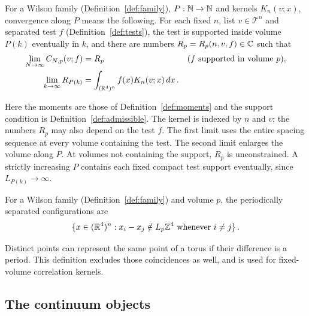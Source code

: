 \begin{definition}\label{def:ordered}
For a Wilson family (Definition~\ref{def:family}), $P:\mathbb N\to\mathbb N$ and kernels $K_n(v;x)$, convergence along $P$ means the following.
For each fixed $n$, list $v\in\mathcal T^n$ and separated test $f$ (Definition~\ref{def:tests}), the test is supported inside volume $P(k)$ eventually in $k$, and there are numbers $R_p=R_p(n,v,f)\in\mathbb C$ such that
\begin{equation}\label{eq:ordered}
\begin{aligned}
\lim_{N\to\infty}C_{N,p}(v;f)&=R_p
&&\text{($f$ supported in volume $p$)},\\
\lim_{k\to\infty}R_{P(k)}&=\int_{(\mathbb R^4)^n}f(x)K_n(v;x)\,dx\,.
\end{aligned}
\end{equation}
\end{definition}

Here the moments are those of Definition~\ref{def:moments} and the support condition is Definition~\ref{def:admissible}.
The kernel is indexed by $n$ and $v$; the numbers $R_p$ may also depend on the test $f$.
The first limit uses the entire spacing sequence at every volume containing the test.
The second limit enlarges the volume along $P$.
At volumes not containing the support, $R_p$ is unconstrained.
A strictly increasing $P$ contains each fixed compact test support eventually, since $L_{P(k)}\to\infty$.

\begin{definition}\label{def:periodic}
For a Wilson family (Definition~\ref{def:family}) and volume $p$, the periodically separated configurations are
\begin{equation}\label{eq:periodic-separated}
\{x\in(\mathbb R^4)^n:x_i-x_j\notin L_p\mathbb Z^4\text{ whenever }i\ne j\}\,.
\end{equation}
\end{definition}

Distinct points can represent the same point of a torus if their difference is a period.
This definition excludes those coincidences as well, and is used for fixed-volume correlation kernels.

\subsection{The continuum objects}\label{subsec:continuum-objects}

